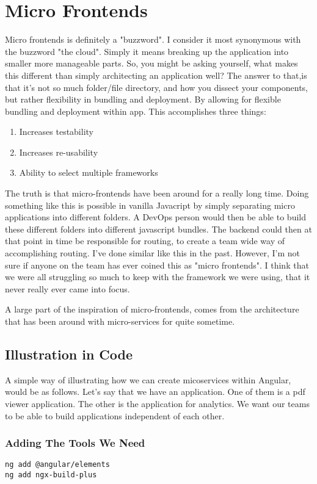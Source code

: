 \chapter{ Micro Frontends }
Micro frontends is definitely a "buzzword". I consider it most synonymous with the buzzword "the cloud". Simply it means breaking up the application into smaller more manageable parts. So, you might be asking yourself, what makes this different than simply architecting an application well? The answer to that,is that it's not so much folder/file directory, and how you dissect your components, but rather flexibility in bundling and deployment. By allowing for flexible bundling and deployment within app. This accomplishes three things: 
\begin{enumerate}
  \item Increases testability
  \item Increases re-usability
  \item Ability to select multiple frameworks
\end{enumerate}

The truth is that micro-frontends have been around for a really long time. Doing something like this is possible in vanilla Javacript by simply separating micro applications into different folders. A DevOps person would then be able to build these different folders into different javascript bundles. The backend could then at that point in time be responsible for routing, to create a team wide way of accomplishing routing. I've done similar like this in the past. However, I'm not sure if anyone on the team has ever coined this as "micro frontends". I think that we were all struggling so much to keep with the framework we were using, that it never really ever came into focus. 

A large part of the inspiration of micro-frontends, comes from the architecture that has been around with micro-services for quite sometime. 

\section{Illustration in Code}
A simple way of illustrating how we can create micoservices within Angular, would be as follows. Let's say that we have an application. One of them is a pdf viewer application. The other is the application for analytics. We want our teams to be able to build applications independent of each other. 

\subsection{Adding The Tools We Need}
\begin{verbatim}
ng add @angular/elements
ng add ngx-build-plus
\end{verbatim}

